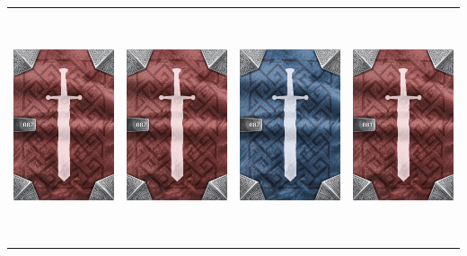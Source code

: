 \documentclass{minimal}
\begin{document}
{\begin{longtable}{llll}
\includegraphics[width=44mm,height=68mm]{./64-151/gh-082b-night-blade-back.png} &
\includegraphics[width=44mm,height=68mm]{./64-151/gh-082b-night-blade-back.png} &
\includegraphics[width=44mm,height=68mm]{./64-151/gh-082a-night-blade-back.png} &
\includegraphics[width=44mm,height=68mm]{./64-151/gh-081b-brilliant-blade-back.png}\\ 

\end{longtable}}
\end{document}
